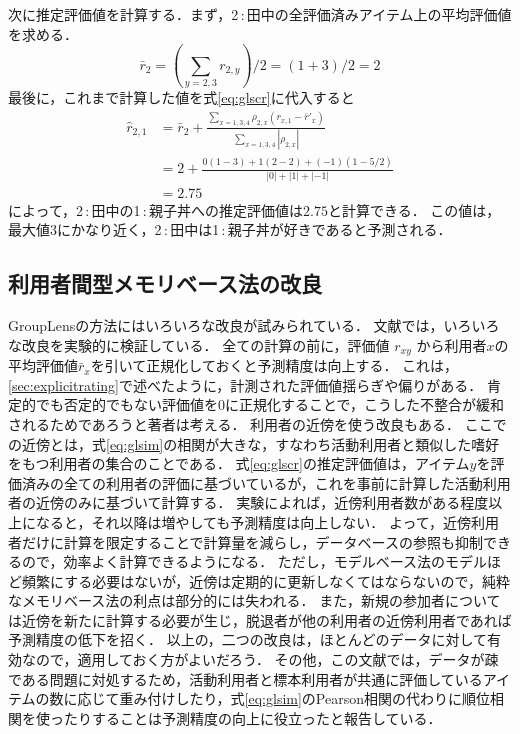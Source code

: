 次に推定評価値を計算する．まず，2\,:\,田中の全評価済みアイテム上の平均評価値を求める．
\[
\bar{r}_2=(\sum_{y=2,3}r_{2,y})/2=(1+3)/2=2 
\]
最後に，これまで計算した値を式\eqref{eq:glscr}に代入すると
{\small\begin{align*}
\hat{r}_{2,1}&=\bar{r}_2+
\frac{\sum_{x=1,3,4}\rho_{2,x}(r_{x,1}-{\bar{r}'}_x)}%
{\sum_{x=1,3,4}|\rho_{2,x}|} \\
&=2+\frac{0(1-3)+1(2-2)+(-1)(1-5/2)}{|0|+|1|+|-1|}\\
&=2.75
\end{align*}}
によって，2\,:\,田中の1\,:\,親子丼への推定評価値は$2.75$と計算できる．
この値は，最大値3にかなり近く，2\,:\,田中は1\,:\,親子丼が好きであると予測される．


\subsection{利用者間型メモリベース法の改良}

GroupLensの方法にはいろいろな改良が試みられている．
文献\cite{sigir:99:02}では，いろいろな改良を実験的に検証している．
全ての計算の前に，評価値 $r_{xy}$ から利用者$x$の平均評価値$\bar{r}_x$を引いて正規化しておくと予測精度は向上する．
これは，\ref{sec:explicitrating}で述べたように，計測された評価値揺らぎや偏りがある．
肯定的でも否定的でもない評価値を$0$に正規化することで，こうした不整合が緩和されるためであろうと著者は考える．
利用者の近傍を使う改良もある．
ここでの近傍とは，式\eqref{eq:glsim}の相関が大きな，すなわち活動利用者と類似した嗜好をもつ利用者の集合のことである．
式\eqref{eq:glscr}の推定評価値は，アイテム$y$を評価済みの全ての利用者の評価に基づいているが，これを事前に計算した活動利用者の近傍のみに基づいて計算する．
実験によれば，近傍利用者数がある程度以上になると，それ以降は増やしても予測精度は向上しない．
よって，近傍利用者だけに計算を限定することで計算量を減らし，データベースの参照も抑制できるので，効率よく計算できるようになる．
ただし，モデルベース法のモデルほど頻繁にする必要はないが，近傍は定期的に更新しなくてはならないので，純粋なメモリベース法の利点は部分的には失われる．
また，新規の参加者については近傍を新たに計算する必要が生じ，脱退者が他の利用者の近傍利用者であれば予測精度の低下を招く．
以上の，二つの改良は，ほとんどのデータに対して有効なので，適用しておく方がよいだろう．
その他，この文献\cite{sigir:99:02}では，データが疎である問題に対処するため，活動利用者と標本利用者が共通に評価しているアイテムの数に応じて重み付けしたり，式\eqref{eq:glsim}のPearson相関の代わりに順位相関を使ったりすることは予測精度の向上に役立ったと報告している．

